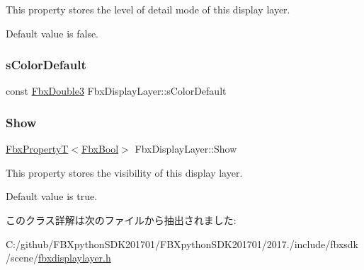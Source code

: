 This property stores the level of detail mode of this display layer.

Default value is false. \mbox{\label{class_fbx_display_layer_a41bcfbb4b645d20daba8da41307fc1a5}} 
\subsubsection{\texorpdfstring{s\+Color\+Default}{sColorDefault}}
{\footnotesize\ttfamily const \hyperlink{fbxtypes_8h_ae0a96f14cde566774c7553aa7523b7a7}{Fbx\+Double3} Fbx\+Display\+Layer\+::s\+Color\+Default\hspace{0.3cm}{\ttfamily [static]}}

\mbox{\label{class_fbx_display_layer_a06b26abb009bd57c5472c134c3dff9e1}} 
\subsubsection{\texorpdfstring{Show}{Show}}
{\footnotesize\ttfamily \hyperlink{class_fbx_property_t}{Fbx\+PropertyT}$<$\hyperlink{fbxtypes_8h_a92e0562b2fe33e76a242f498b362262e}{Fbx\+Bool}$>$ Fbx\+Display\+Layer\+::\+Show}

This property stores the visibility of this display layer.

Default value is true. 

このクラス詳解は次のファイルから抽出されました\+:\begin{DoxyCompactItemize}
\item 
C\+:/github/\+F\+B\+Xpython\+S\+D\+K201701/\+F\+B\+Xpython\+S\+D\+K201701/2017./include/fbxsdk/scene/\hyperlink{fbxdisplaylayer_8h}{fbxdisplaylayer.\+h}\end{DoxyCompactItemize}
